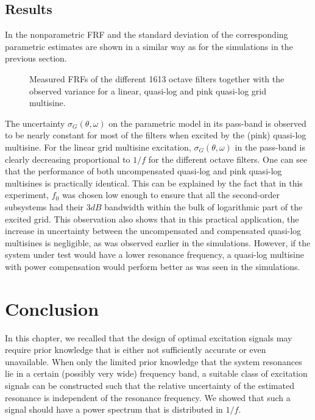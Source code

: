     \subsection{Results}
    In  the nonparametric \gls{FRF} and the standard deviation of the corresponding parametric estimates are shown in a similar way as for the simulations in the previous section.

    \begin{figure}%
    \centering
      \setlength{}
      \setlength\figureheight{0.68\figurewidth}
    
    \caption[Measurements of all BK1613 octave filters using different excitation signals.]{Measured FRFs of the different \bruelkjaer{} 1613 octave filters together with the observed variance for a linear, quasi-log and pink quasi-log grid multisine.}
      \label{fig:excitation:measurements}
    \end{figure}

    The uncertainty $\sigma_G\left(\theta,\omega\right)$ on the parametric model in its pass-band is observed to be nearly constant for most of the filters when excited by the (pink) quasi-log multisine.
    For the linear grid multisine excitation, $\sigma_G\left(\theta,\omega\right)$ in the pass-band is clearly decreasing proportional to $1 / f$ for the different octave filters.
    One can see that the performance of both uncompensated quasi-log and pink quasi-log multisines is practically identical.
    This can be explained by the fact that in this experiment, $f_0$ was chosen low enough to ensure that all the second-order subsystems had their $3\unit{dB}$ bandwidth within the bulk of logarithmic part of the excited grid.
    This observation also shows that in this practical application, the increase in uncertainty between the uncompensated and compensated quasi-log multisines is negligible, as was observed earlier in the simulations.
    However, if the system under test would have a lower resonance frequency, a quasi-log multisine with power compensation would perform better as was seen in the simulations.

\section{Conclusion}
\label{sec:excitation:conclusion}
In this chapter, we recalled that the design of optimal excitation signals may require prior knowledge that is either not sufficiently accurate or even unavailable.
When only the limited prior knowledge that the system resonances lie in a certain (possibly very wide) frequency band, a suitable class of excitation signals can be constructed such that the relative uncertainty of the estimated resonance is independent of the resonance frequency.
We showed that such a signal should have a power spectrum that is distributed in $1/f$.


